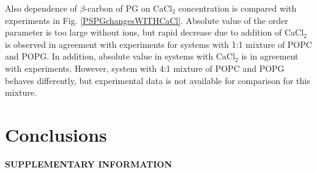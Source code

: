 \documentclass[aps,prl,superscriptaddress,twocolumn]{revtex4}
\begin{document}
Also dependence of $\beta$-carbon of PG on CaCl$_2$ concentration is compared with
experiments \cite{borle85} in Fig. \ref{PSPGchangesWITHCaCl}. Absolute value of
the order parameter is too large without ions, but rapid decrease due to addition of
CaCl$_2$ is observed in agreement with experiments for systems with 1:1 mixture of POPC and POPG.
In addition, absolute value in systems with CaCl$_2$ is in agreement with experiments.
However, system with 4:1 mixture of POPC and POPG behaves differently, but experimental
data is not available for comparison for this mixture.



\section{Conclusions}


%

\begin{acknowledgments}
\end{acknowledgments}
\newpage
\appendix
\begin{center}
{\bf SUPPLEMENTARY INFORMATION}
\end{center}
\end{document}
